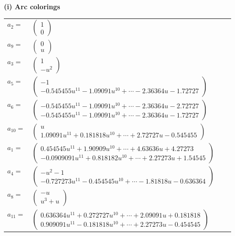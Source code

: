 \documentclass[1p]{elsarticle_modified}
\theoremstyle{definition}
\begin{document}
\flushleft \textbf{(i) Arc colorings}\\
\begin{tabular}{m{7pt} m{180pt} m{7pt} m{180pt} }
\flushright $a_{2}=$&$\begin{pmatrix}1\\0\end{pmatrix}$ \\
\flushright $a_{9}=$&$\begin{pmatrix}0\\u\end{pmatrix}$ \\
\flushright $a_{3}=$&$\begin{pmatrix}1\\- u^2\end{pmatrix}$ \\
\flushright $a_{5}=$&$\begin{pmatrix}-1\\-0.545455 u^{11}-1.09091 u^{10}+\cdots-2.36364 u-1.72727\end{pmatrix}$ \\
\flushright $a_{6}=$&$\begin{pmatrix}-0.545455 u^{11}-1.09091 u^{10}+\cdots-2.36364 u-2.72727\\-0.545455 u^{11}-1.09091 u^{10}+\cdots-2.36364 u-1.72727\end{pmatrix}$ \\
\flushright $a_{10}=$&$\begin{pmatrix}u\\1.09091 u^{11}+0.181818 u^{10}+\cdots+2.72727 u-0.545455\end{pmatrix}$ \\
\flushright $a_{1}=$&$\begin{pmatrix}0.454545 u^{11}+1.90909 u^{10}+\cdots+4.63636 u+4.27273\\-0.0909091 u^{11}+0.818182 u^{10}+\cdots+2.27273 u+1.54545\end{pmatrix}$ \\
\flushright $a_{4}=$&$\begin{pmatrix}- u^2-1\\-0.727273 u^{11}-0.454545 u^{10}+\cdots-1.81818 u-0.636364\end{pmatrix}$ \\
\flushright $a_{8}=$&$\begin{pmatrix}- u\\u^3+u\end{pmatrix}$ \\
\flushright $a_{11}=$&$\begin{pmatrix}0.636364 u^{11}+0.272727 u^{10}+\cdots+2.09091 u+0.181818\\0.909091 u^{11}-0.181818 u^{10}+\cdots+2.27273 u-0.454545\end{pmatrix}$ \\

\end{tabular}
\end{document}
